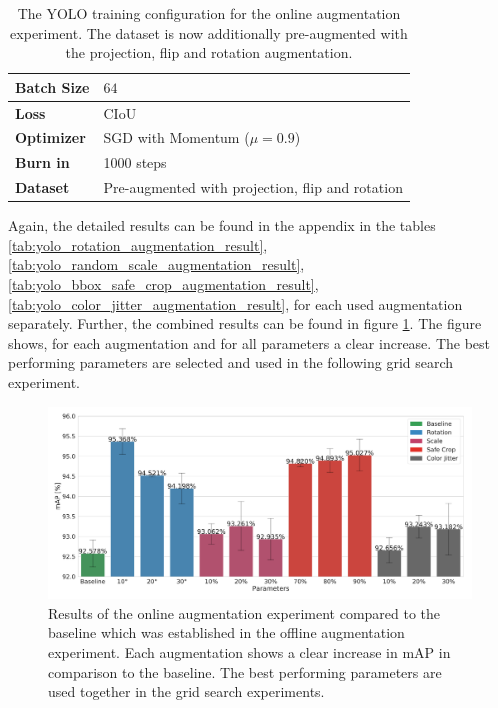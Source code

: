 \begin{table}[H]
\footnotesize
\begin{center}
\begin{tabular}{|l|l|}

\hline
\textbf{Batch Size} & $64$\\
\hline
\textbf{Loss} & CIoU \\
\hline
\textbf{Optimizer} & SGD with Momentum ($\mu = 0.9$)\\
\hline
\textbf{Burn in} & 1000 steps \\
\hline
\textbf{Dataset} & Pre-augmented with projection, flip and rotation \\
\hline

\end{tabular}
\caption{The YOLO training configuration for the online augmentation experiment. The dataset is now additionally pre-augmented with the projection, flip and rotation augmentation.}
\label{tab:yolo_online_config}
\end{center}
\end{table}

Again, the detailed results can be found in the appendix in the tables \ref{tab:yolo_rotation_augmentation_result}, \ref{tab:yolo_random_scale_augmentation_result}, \ref{tab:yolo_bbox_safe_crop_augmentation_result}, \ref{tab:yolo_color_jitter_augmentation_result}, for each used augmentation separately.
Further, the combined results can be found in figure \ref{fig:yolo_online_aug_results}.
The figure shows, for each augmentation and for all parameters a clear increase.
The best performing parameters are selected and used in the following grid search experiment.

\begin{figure}
\begin{center}
    \includegraphics[width=16cm]{imgs/yolo_online_aug_experiment.pdf}
    \caption{Results of the online augmentation experiment compared to the baseline which was established in the offline augmentation experiment. Each augmentation shows a clear increase in mAP in comparison to the baseline. The best performing parameters are used together in the grid search experiments.}
    \label{fig:yolo_online_aug_results}
\end{center}
\end{figure}

